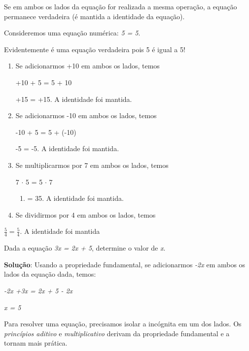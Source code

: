 \begin{caixa}
Se em ambos os lados da equação for realizada a mesma operação, a equação permanece verdadeira (é mantida a identidade da equação).
\end{caixa}

\begin{texemplo}
Consideremos uma equação numérica:   \textit{5 = 5}.

Evidentemente é uma equação verdadeira pois 5 é igual a 5!

\begin{enumerate}
\item Se adicionarmos +10 em ambos os lados, temos

+10 + 5 = 5 + 10

+15 = +15. A identidade foi mantida.

	\item Se adicionarmos -10 em ambos os lados, temos

-10 + 5 = 5 + (-10)

-5 = -5. A identidade foi mantida.

	\item Se multiplicarmos por 7 em ambos os lados, temos

7 $ \cdot $  5 = 5 $ \cdot $  7

\begin{enumerate}
	\item = 35. A identidade foi mantida.
\end{enumerate}

	\item Se dividirmos por 4 em ambos os lados, temos
\end{enumerate}

\( \frac{5}{4}=\frac{5}{4} \). A identidade foi mantida\qedsymbol{}
\end{texemplo}

\begin{texemplo}
Dada a equação \textit{3x = 2x + 5}, determine o valor de \textit{x}.

\textbf{Solução}: Usando a propriedade fundamental, se adicionarmos \textit{-2x} em ambos os lados da equação dada, temos:

\textit{-2x +3x = 2x + 5 - 2x}

\textit{x = 5}\qedsymbol{}
\end{texemplo}

Para resolver uma equação, precisamos isolar a incógnita em um dos lados. Os \textit{princípios aditivo} e \textit{multiplicativo} derivam da propriedade fundamental e a tornam mais prática.

